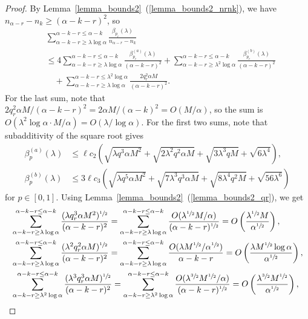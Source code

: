 \documentclass{article}
\theoremstyle{plain}
\theoremstyle{remark}
\theoremstyle{plain}
\numberwithin{equation}{section}
\begin{document}
	\begin{proof}
		By Lemma~\ref{lemma_bounds2}~(\ref{lemma_bounds2_nrnk}), we have $n_{\alpha-r}-n_k\geq(\alpha-k-r)^2$, so
		\begin{align}
			&\sum_{\alpha-k-r\geq\lambda\log\alpha}^{\alpha-k-r\leq\alpha-k}\frac{\beta_{p_r}(\lambda)}{n_{\alpha-r}-n_k}
			\\&\leq4\sum_{\alpha-k-r\geq\lambda\log\alpha}^{\alpha-k-r\leq\alpha-k}\frac{\beta_{p_r}^{(a)}(\lambda)}{(\alpha-k-r)^2}+\sum_{\alpha-k-r\geq\lambda^2\log\alpha}^{\alpha-k-r\leq\alpha-k}\frac{\beta_{p_r}^{(b)}(\lambda)}{(\alpha-k-r)^2}
			\\&\quad+\sum_{\alpha-k-r\geq\lambda\log\alpha}^{\alpha-k-r\leq\lambda^2\log\alpha}\frac{2q_r^2\alpha M}{(\alpha-k-r)^2}.
		\end{align}
		For the last sum, note that $2q_r^2\alpha M/(\alpha-k-r)^2=2\alpha M/(\alpha-k)^2=O(M/\alpha)$, so the sum is $O(\lambda^2\log\alpha\cdot M/\alpha)=O(\lambda/\log\alpha)$. For the first two sums, note that subadditivity of the square root gives
		\begin{align}
			\beta_p^{(a)}(\lambda)&\leq\ell c_2\left(\sqrt{\lambda q^3\alpha M^2}+\sqrt{2\lambda^2q^2\alpha M}+\sqrt{3\lambda^3qM}+\sqrt{6\lambda^4}\right),
			\\\beta_p^{(b)}(\lambda)&\leq3\ell c_3\left(\sqrt{\lambda q^5\alpha M^2}+\sqrt{7\lambda^3q^3\alpha M}+\sqrt{8\lambda^4q^2M}+\sqrt{56\lambda^6}\right)
		\end{align}
		for $p\in[0,1]$. Using Lemma~\ref{lemma_bounds2}~(\ref{lemma_bounds2_qr}), we get
		\begin{align}
			&\sum_{\alpha-k-r\geq\lambda\log\alpha}^{\alpha-k-r\leq\alpha-k}\frac{(\lambda q_r^3\alpha M^2)^{\sfrac12}}{(\alpha-k-r)^2}=\sum_{\alpha-k-r\geq\lambda\log\alpha}^{\alpha-k-r\leq\alpha-k}\frac{O(\lambda^{\sfrac12}M/\alpha)}{(\alpha-k-r)^{\sfrac12}}=O\left(\frac{\lambda^{\sfrac12}M}{\alpha^{\sfrac12}}\right),
			\\&\sum_{\alpha-k-r\geq\lambda\log\alpha}^{\alpha-k-r\leq\alpha-k}\frac{(\lambda^2q_r^2\alpha M)^{\sfrac12}}{(\alpha-k-r)^2}=\sum_{\alpha-k-r\geq\lambda\log\alpha}^{\alpha-k-r\leq\alpha-k}\frac{O(\lambda M^{\sfrac12}/\alpha^{\sfrac12})}{\alpha-k-r}=O\left(\frac{\lambda M^{\sfrac12}\log\alpha}{\alpha^{\sfrac12}}\right),
			\\&\sum_{\alpha-k-r\geq\lambda^2\log\alpha}^{\alpha-k-r\leq\alpha-k}\frac{(\lambda^3q_r^3\alpha M)^{\sfrac12}}{(\alpha-k-r)^2}=\sum_{\alpha-k-r\geq\lambda^2\log\alpha}^{\alpha-k-r\leq\alpha-k}\frac{O(\lambda^{\sfrac32}M^{\sfrac12}/\alpha)}{(\alpha-k-r)^{\sfrac12}}=O\left(\frac{\lambda^{\sfrac32}M^{\sfrac12}}{\alpha^{\sfrac12}}\right),

\end{align}
\end{proof}
\end{document}
